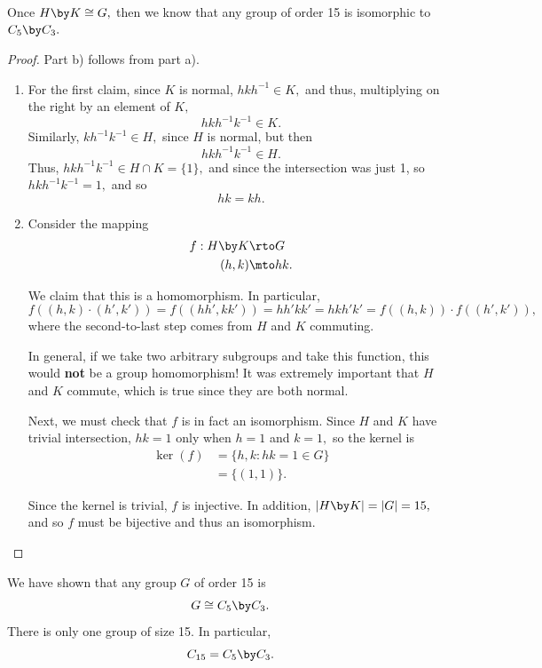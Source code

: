 Once $H \by K \cong G,$ then we know that any group of order 15 is isomorphic to $C_5 \by C_3.$

\begin{proof}

Part b) follows from part a).

\begin{enumerate}[label = (\alph*)]
    \item For the first claim, since $K$ is normal, $hkh^{-1} \in K,$ and thus, multiplying on the right by an element of $K,$ \[hkh^{-1}k^{-1} \in K.\] Similarly, $kh^{-1}k^{-1} \in H,$ since $H$ is normal, but then \[hkh^{-1}k^{-1} \in H.\] Thus, $hkh^{-1}k^{-1} \in H \cap K = \{1\},$ and since the intersection was just 1, so $hkh^{-1}k^{-1} = 1,$ and so \[hk = kh.\]

\item Consider the mapping 
\begin{align*}
f: H \by K &\rto G \\
(h, k) &\mto hk.
\end{align*}

We claim that this is a homomorphism. In particular,
\[
f((h, k) \cdot (h', k')) = f((hh', kk')) = hh'kk' = hkh'k' = f((h, k)) \cdot f((h', k')),
\]
where the second-to-last step comes from $H$ and $K$ commuting.

In general, if we take two arbitrary subgroups and take this function, this would \textbf{not} be a group homomorphism! It was extremely important that $H$ and $K$ commute, which is true since they are both normal.


Next, we must check that $f$ is in fact an isomorphism. Since $H$ and $K$ have trivial intersection, $hk = 1$ only when $h = 1$ and $k = 1,$ so the kernel is
\begin{align*}
\ker(f) &= \{h, k: hk = 1 \in G\} \\
&= \{(1, 1)\}.
\end{align*}

Since the kernel is trivial, $f$ is injective. In addition, $|H \by K| = |G| = 15,$ and so $f$ must be bijective and thus an isomorphism.

\end{enumerate}


\end{proof}

We have shown that any group $G$ of order 15 is
\[
G \cong C_5 \by C_3.
\] There is only one group of size 15. In particular, \[C_{15} = C_5 \by C_3.\]

